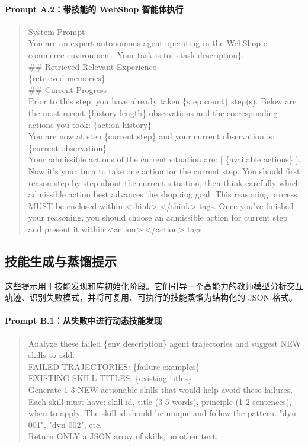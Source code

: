 \documentclass[11pt,UTF8,fontset=fandol]{ctexart}
\begin{document}
\paragraph{Prompt A.2：带技能的 WebShop 智能体执行}
\begin{quote}\small\ttfamily
System Prompt:\\
You are an expert autonomous agent operating in the WebShop e-commerce environment. Your task is to: \{task description\}.\\[0.3em]
\#\# Retrieved Relevant Experience\\
\{retrieved memories\}\\[0.3em]
\#\# Current Progress\\
Prior to this step, you have already taken \{step count\} step(s). Below are the most recent \{history length\} observations and the corresponding actions you took: \{action history\}\\
You are now at step \{current step\} and your current observation is: \{current observation\}\\
Your admissible actions of the current situation are: [ \{available actions\} ].\\[0.3em]
Now it's your turn to take one action for the current step. You should first reason step-by-step about the current situation, then think carefully which admissible action best advances the shopping goal. This reasoning process MUST be enclosed within <think> </think> tags. Once you've finished your reasoning, you should choose an admissible action for current step and present it within <action> </action> tags.
\end{quote}

\subsection{技能生成与蒸馏提示}

这些提示用于技能发现和库初始化阶段。它们引导一个高能力的教师模型分析交互轨迹、识别失败模式，并将可复用、可执行的技能蒸馏为结构化的 JSON 格式。

\paragraph{Prompt B.1：从失败中进行动态技能发现}
\begin{quote}\small\ttfamily
Analyze these failed \{env description\} agent trajectories and suggest NEW skills to add.\\[0.3em]
FAILED TRAJECTORIES: \{failure examples\}\\
EXISTING SKILL TITLES: \{existing titles\}\\[0.3em]
Generate 1-3 NEW actionable skills that would help avoid these failures. Each skill must have: skill id, title (3-5 words), principle (1-2 sentences), when to apply. The skill id should be unique and follow the pattern: "dyn 001", "dyn 002", etc.\\[0.3em]
Return ONLY a JSON array of skills, no other text.
\end{quote}
\end{document}
